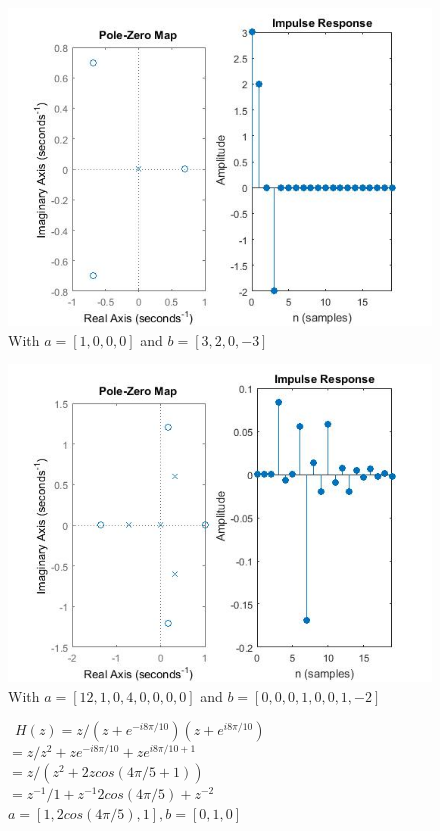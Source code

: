 \documentclass{article}
\begin{document}
\begin{figure}[H]
\includegraphics[scale = .5]{report5_2} 
\\ With $a = [1,0,0,0]$ and $b = [3,2,0,-3]$
\end{figure}

\begin{figure}[H]
\includegraphics[scale = .5]{report5_3}
\\ With $a = [12,1,0,4,0,0,0,0]$ and $b =[0,0,0,1,0,0,1,-2]$
\end{figure}

\begin{figure}[H]
\ $H(z) = z/{(z+e^{-i8\pi/10})(z+e^{i8\pi/10})}$
\\ $ = z/{z^2 + ze^{-i8\pi/10} + ze^{i8\pi/10 + 1}}$
\\ $ = z/(z^2+2zcos(4\pi/5 + 1))$
\\ $ = z^{-1}/{1 + z^{-1}2cos(4\pi/5) + z^{-2}}$
\\ $ a = [1,2cos(4\pi/5),1], b = [0,1,0]$
\end{figure}



\break
\end{document}
